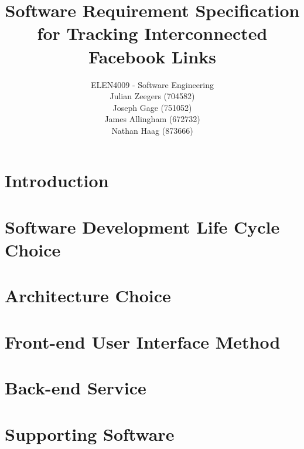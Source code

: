 \documentclass[10pt,onecolumn]{article}
\title{\vspace{-4.2cm}Software Requirement Specification for Tracking Interconnected Facebook Links }
\author{ ELEN4009 - Software Engineering\\ Julian Zeegers (704582) \\  Joseph Gage (751052)\\ James Allingham (672732) \\ Nathan Haag (873666)}
\begin{document}
\date{\vspace{-5ex}}
\maketitle
\pagestyle{plain}
\setcounter{page}{1}



\section{Introduction}
 

\section{Software Development Life Cycle Choice}



\section{Architecture Choice}

\section{Front-end User Interface Method}


\section{Back-end Service}
\section{Supporting Software}


\begin{thebibliography}{1}

	
	
\end{thebibliography}

\clearpage
\end{document}
